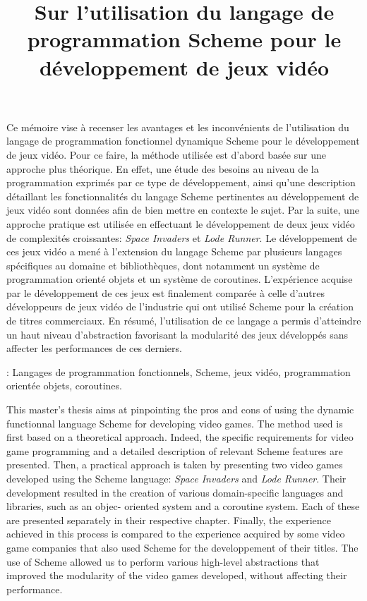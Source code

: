 \documentclass[12pt,twoside,letterpaper,francais]{book}
\title{Sur l'utilisation du langage de programmation Scheme pour
  le développement de jeux vidéo}
\begin{document}
\setcounter{page}{1}
\PagesCouverture

\doublespacing

\resume

Ce mémoire vise à recenser les avantages et les inconvénients de
l'utilisation du langage de programmation fonctionnel dynamique
Scheme pour le dévelop\-pement de jeux vidéo. Pour ce faire, la
méthode utilisée est d'abord basée sur une approche plus théorique. En
effet, une étude des besoins au niveau de la programmation exprimés
par ce type de dévelop\-pement, ainsi qu'une description détaillant les
fonctionnalités du langage Scheme pertinentes au dévelop\-pement de
jeux vidéo sont données afin de bien mettre en contexte le sujet. Par
la suite, une approche pratique est utilisée en effectuant le
dévelop\-pement de deux jeux vidéo de complexités croissantes: \textit{Space Invaders} et
\textit{Lode Runner}. Le dévelop\-pement de ces jeux vidéo a mené à l'extension du
langage Scheme par plusieurs langages spécifiques au domaine et
bibliothèques, dont notamment un système de programmation orienté
objets et un système de coroutines. L'expérience acquise par le
dévelop\-pement de ces jeux est finalement comparée à celle d'autres
développeurs de jeux vidéo de l'industrie qui ont utilisé Scheme
pour la création de titres commerciaux. En résumé, l'utilisation de ce
langage a permis d'atteindre un haut niveau d'abstraction favorisant
la modularité des jeux développés sans affecter les performances de
ces derniers.

\vspace{2em}

: Langages de programmation fonctionnels,
Scheme, jeux vidéo, programmation orientée objets, coroutines.

\abstract


This master's thesis aims at pinpointing the pros and cons of using
the dynamic functionnal language Scheme for developing video
games. The method used is first based on a theoretical
approach. Indeed, the specific requirements for video game programming
and a detailed description of relevant Scheme features are presented.
Then, a practical approach is taken by presenting two video games
developed using the Scheme language: \textit{Space Invaders} and \textit{Lode Runner}. Their
development resulted in the creation of various domain-specific
languages and libraries, such as an objec- oriented system and a
coroutine system. Each of these are presented separately in their respective
chapter. Finally, the experience achieved in this process is compared
to the experience acquired by some video game companies that also used
Scheme for the developpement of their titles. The use of
Scheme allowed us to perform various high-level abstractions that
improved the modularity of the video games developed, without
affecting their performance.
\end{document}
